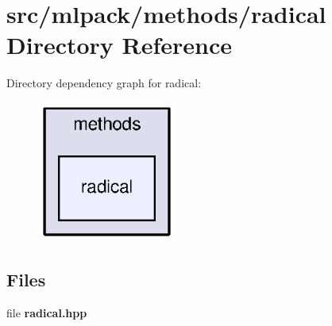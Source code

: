 \section{src/mlpack/methods/radical Directory Reference}
\label{dir_ea964724cc6f7233682f5d8978c9745d}
Directory dependency graph for radical\+:
\nopagebreak
\begin{figure}[H]
\begin{center}
\leavevmode
\includegraphics[width=130pt]{dir_ea964724cc6f7233682f5d8978c9745d_dep}
\end{center}
\end{figure}
\subsection*{Files}
\begin{DoxyCompactItemize}
\item 
file {\bf radical.\+hpp}
\end{DoxyCompactItemize}
